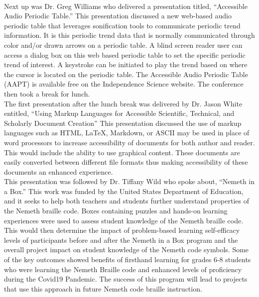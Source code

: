 \documentclass[11pt]{sig-alternate}
\begin{document}
\vspace{2.5 mm}\\Next up was Dr. Greg Williams who delivered a presentation titled, “Accessible Audio Periodic Table.” This presentation discussed a new web-based audio periodic table that leverages sonification tools to communicate periodic trend information. It is this periodic trend data that is normally communicated through color and/or drawn arrows on a periodic table. A blind screen reader user can access a dialog box on this web based periodic table to set the specific periodic trend of interest. A keystroke can be initiated to play the trend based on where the cursor is located on the periodic table. The Accessible Audio Periodic Table (AAPT) is available free on the Independence Science website. The conference then took a break for lunch.
\vspace{2.5 mm}\\The first presentation after the lunch break was delivered by Dr. Jason White entitled, “Using Markup Languages for Accessible Scientific, Technical, and Scholarly Document Creation” This presentation discussed the use of markup languages such as HTML, LaTeX, Markdown, or ASCII may be used in place of word processors to increase accessibility of documents for both author and reader. This would include the ability to use graphical content. These documents are easily converted between different file formats thus making accessibility of these documents an enhanced experience.
\vspace{2.5 mm}\\This presentation was followed by Dr. Tiffany Wild who spoke about, “Nemeth in a Box.” This work was funded by the United States Department of Education, and it seeks to help both teachers and students further understand properties of the Nemeth braille code. Boxes containing puzzles and hands-on learning experiences were used to assess student knowledge of the Nemeth braille code. This would then determine the impact of problem-based learning self-efficacy levels of participants before and after the Nemeth in a Box program and the overall project impact on student knowledge of the Nemeth code symbols. Some of the key outcomes showed benefits of firsthand learning for grades 6-8 students who were learning the Nemeth Braille code and enhanced levels of proficiency during the Covid19 Pandemic. The success of this program will lead to projects that use this approach in future Nemeth code braille instruction.
\end{document}
